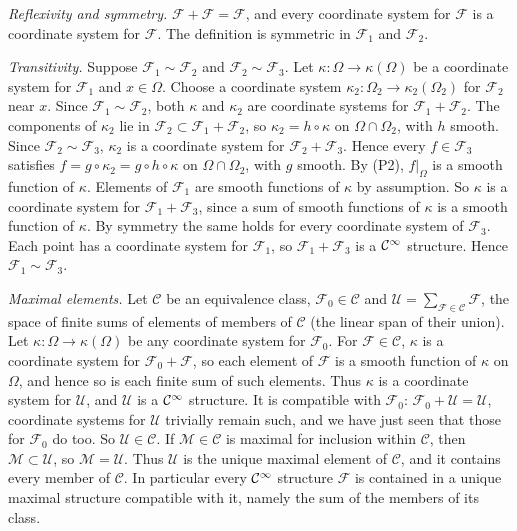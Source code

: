 \emph{Reflexivity and symmetry.} $\mathcal F+\mathcal F=\mathcal F$, and every coordinate
system for $\mathcal F$ is a coordinate system for $\mathcal F$. The definition is
symmetric in $\mathcal F_1$ and $\mathcal F_2$.

\emph{Transitivity.} Suppose $\mathcal F_1\sim\mathcal F_2$ and $\mathcal F_2\sim\mathcal F_3$.
Let $\kappa:\Omega\to\kappa(\Omega)$ be a coordinate system for $\mathcal F_1$ and
$x\in\Omega$. Choose a coordinate system $\kappa_2:\Omega_2\to\kappa_2(\Omega_2)$ for $\mathcal F_2$
near $x$. Since $\mathcal F_1\sim\mathcal F_2$, both $\kappa$ and $\kappa_2$ are coordinate
systems for $\mathcal F_1+\mathcal F_2$. The components of $\kappa_2$ lie in $\mathcal F_2\subset\mathcal F_1+\mathcal F_2$, so
$\kappa_2=h\circ\kappa$ on $\Omega\cap\Omega_2$, with $h$ smooth. Since
$\mathcal F_2\sim\mathcal F_3$, $\kappa_2$ is a coordinate system for $\mathcal F_2+\mathcal F_3$.
Hence every $f\in\mathcal F_3$ satisfies $f=g\circ\kappa_2=g\circ h\circ\kappa$ on
$\Omega\cap\Omega_2$, with $g$ smooth. By (P2), $f|_\Omega$ is a smooth function of $\kappa$.
Elements of $\mathcal F_1$ are smooth functions of $\kappa$ by assumption. So $\kappa$ is a
coordinate system for $\mathcal F_1+\mathcal F_3$, since a sum of smooth functions of $\kappa$ is
a smooth function of $\kappa$. By symmetry the same holds for every
coordinate system of $\mathcal F_3$. Each point has a coordinate system for $\mathcal F_1$, so
$\mathcal F_1+\mathcal F_3$ is a $\mathcal{C}^\infty$ structure. Hence $\mathcal F_1\sim\mathcal F_3$.

\emph{Maximal elements.} Let $\mathcal C$ be an equivalence class, $\mathcal F_0\in\mathcal C$ and
$\mathcal U=\sum_{\mathcal F\in\mathcal C}\mathcal F$, the space of finite sums of elements of members
of $\mathcal C$ (the linear span of their union). Let $\kappa:\Omega\to\kappa(\Omega)$ be any
coordinate system for $\mathcal F_0$. For $\mathcal F\in\mathcal C$, $\kappa$ is a coordinate
system for $\mathcal F_0+\mathcal F$, so each element of $\mathcal F$ is a smooth function of
$\kappa$ on $\Omega$, and hence so is each finite sum of such elements. Thus $\kappa$ is a
coordinate system for $\mathcal U$, and $\mathcal U$ is a
$\mathcal{C}^\infty$ structure. It is compatible with $\mathcal F_0$: $\mathcal F_0+\mathcal U=\mathcal U$,
coordinate systems for $\mathcal U$ trivially remain such, and we have just seen that those
for $\mathcal F_0$ do too. So $\mathcal U\in\mathcal C$. If $\mathcal M\in\mathcal C$ is maximal for
inclusion within $\mathcal C$, then $\mathcal M\subset\mathcal U$, so $\mathcal M=\mathcal U$. Thus
$\mathcal U$ is the unique maximal element of $\mathcal C$, and it contains every member of
$\mathcal C$. In particular every $\mathcal{C}^\infty$ structure $\mathcal F$ is contained in a unique
maximal structure compatible with it, namely the sum of the members of its class.

